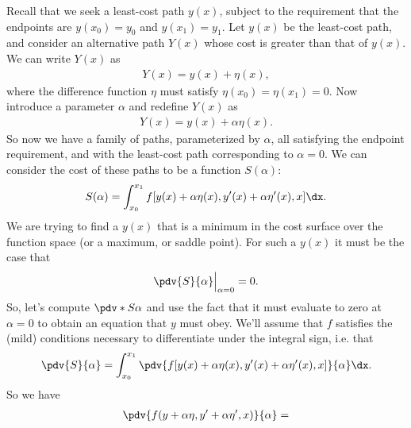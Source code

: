 Recall that we seek a least-cost path $y(x)$, subject to the requirement that the endpoints are
$y(x_0) = y_0$ and $y(x_1) = y_1$. Let $y(x)$ be the least-cost path, and consider an alternative
path $Y(x)$ whose cost is greater than that of $y(x)$. We can write $Y(x)$ as
\begin{align*}
  Y(x) = y(x) + \eta(x),
\end{align*}
where the difference function $\eta$ must satisfy $\eta(x_0) = \eta(x_1) = 0$.  Now introduce a
parameter $\alpha$ and redefine $Y(x)$ as
\begin{align*}
  Y(x) = y(x) + \alpha\eta(x).
\end{align*}
So now we have a family of paths, parameterized by $\alpha$, all satisfying the endpoint requirement,
and with the least-cost path corresponding to $\alpha=0$. We can consider the cost of these paths to
be a function $S(\alpha)$:
\begin{align*}
  S(\alpha) = \int_{x_0}^{x_1} f[y(x) + \alpha\eta(x), y'(x) + \alpha\eta'(x), x] \dx.
\end{align*}
We are trying to find a $y(x)$ that is a minimum in the cost surface over the function space (or a
maximum, or saddle point). For such a $y(x)$ it must be the case that
\begin{align*}
  \pdv{S}{\alpha}\Big|_{\alpha=0} = 0.
\end{align*}
So, let's compute $\pdv*{S}{\alpha}$ and use the fact that it must evaluate to zero at $\alpha=0$ to
obtain an equation that $y$ must obey. We'll assume that $f$ satisfies the (mild) conditions
necessary to differentiate under the integral sign, i.e. that
\begin{align*}
  \pdv{S}{\alpha} = \int_{x_0}^{x_1} \pdv{f[y(x) + \alpha\eta(x), y'(x) + \alpha\eta'(x), x]}{\alpha} \dx.
\end{align*}
So we have
\begin{align*}
  \pdv{f(y + \alpha\eta, y' + \alpha\eta', x)}{\alpha} =
\end{align*}
